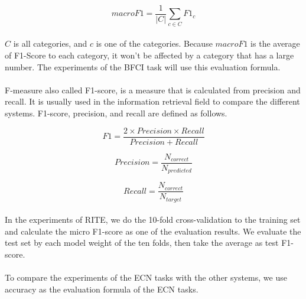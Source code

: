 \documentclass[12pt]{article}
\begin{document}
\begin{CJK*}{UTF8}{bkai}
\begin{spacing}{1.77}
\begin{equation}
  macroF1=\frac{1}{|C|}\sum_{c\in C}F1_c
\end{equation}

\paragraph{}
$C$ is all categories, and $c$ is one of the categories. Because $macroF1$ is the average of F1-Score to each category, it won't be affected by a category that has a large number. The experiments of the BFCI task will use this evaluation formula.

\paragraph{}
F-measure also called F1-score, is a measure that is calculated from precision and recall. It is usually used in the information retrieval field to compare the different systems. F1-score, precision, and recall are defined as follows.

\begin{equation}
  F1=\frac{2\times Precision\times Recall}{Precision+Recall}
\end{equation}

\begin{equation}
  Precision=\frac{N_{correct}}{N_{predicted}}
\end{equation}

\begin{equation}
  Recall=\frac{N_{correct}}{N_{target}}
\end{equation}

\paragraph{}
In the experiments of RITE, we do the 10-fold cross-validation to the training set and calculate the micro F1-score as one of the evaluation results. We evaluate the test set by each model weight of the ten folds, then take the average as test F1-score.

\paragraph{}
To compare the experiments of the ECN tasks with the other systems, we use accuracy as the evaluation formula of the ECN tasks.


\end{spacing}
\end{CJK*}
\end{document}
